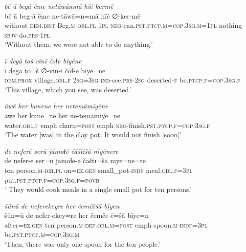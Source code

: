 \ea \label{RE.64}
\textit{bē ā begā ēme netāwānmā ħīč kermē} \\ 
\gll bē ā beg-ā ēme ne-tāwā=n=mā ħīč ∅-ker-mē \\ 
 without \textsc{dem.dist} Beg\textsc{.m}\textsc{-obl}\textsc{.pl} \textsc{1pl} \textsc{neg-}can\textsc{.pst}\textsc{.ptcp}\textsc{.m}\textsc{=cop}\textsc{.3sg}\textsc{.m}\textsc{=\textsc{1pl}} nothing \textsc{sbjv-}do\textsc{.prs}\textsc{-\textsc{1pl}} \\ 
\glt `Without them, we were not able to do anything.'
\z 
 
\ea \label{ŽE.4}
\textit{ī degā toš vīnī čoɫe bīyēne} \\ 
\gll ī degā to=š ∅-vīn-ī čoɫ-e bīyē=ne \\ 
 \textsc{dem.prox} village\textsc{.obl}\textsc{\textsc{.f}} \textsc{2sg}\textsc{=3sg} \textsc{ind-}see\textsc{.prs}-\textsc{2sg} deserted-\textsc{f} be\textsc{.ptcp}\textsc{\textsc{.f}}\textsc{=cop}\textsc{.3sg}\textsc{\textsc{.f}} \\ 
\glt `This village, which you see, was deserted.'
\z 
 
\ea \label{ŽE.21}
\textit{āwē her kunene her netemāmīyēne} \\ 
\gll āwē her kune=ne her ne-temāmīyē=ne \\ 
 water\textsc{.obl}\textsc{.f} emph churn\textsc{=\textsc{post}} emph \textsc{neg-}finish\textsc{.pst}\textsc{.ptcp}\textsc{.f}\textsc{=cop}\textsc{.3sg}\textsc{.f} \\ 
\glt `The water [was] in the clay pot. It would not finish [soon]'
\z 
 
\ea \label{ŽE.27}
\textit{de neferē serū jāmoɫē čāštīšā nīyēnere} \\ 
\gll de nefer-ē ser=ū jāmoɫē-ē čāštī=šā nīyē=ne=re \\ 
 ten person\textsc{.m}\textsc{-dir}\textsc{.pl} on\textsc{\textsc{=ez.gen}} small\_pot\textsc{-indf} meal\textsc{.obl}\textsc{.f}\textsc{=3pl} put\textsc{.pst}\textsc{.ptcp}\textsc{.f}\textsc{=cop}\textsc{.3sg}\textsc{.f}\textsc{=\textsc{povb}} \\ 
\glt ` They would cook meals in a single small pot for ten persons.'
\z 
 
\ea \label{ŽE.28}
\textit{šūnū de neferekeyre her čemčēšā bīyen} \\ 
\gll šūn=ū de nefer-ekey=re her čemče-ē=šā bīye=n \\ 
 after\textsc{\textsc{=ez.gen}} ten person\textsc{.m}\textsc{-def}\textsc{.obl}\textsc{.m}\textsc{=\textsc{post}} emph spoon\textsc{.m}\textsc{-indf}\textsc{=3pl} be\textsc{.pst}\textsc{.ptcp}\textsc{.m}\textsc{=cop}\textsc{.3sg}\textsc{.m} \\ 
\glt `Then, there was only one spoon for the ten people.'
\z 
 
